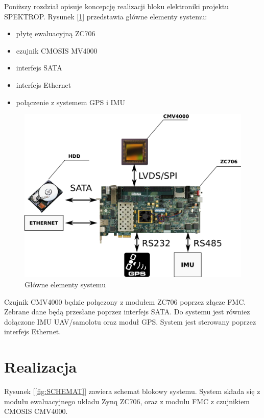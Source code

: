 \documentclass[a4paper,11pt,oneside]{book}  %
\begin{document}
Poniższy rozdział opisuje koncepcję realizacji bloku elektroniki projektu SPEKTROP. Rysunek [\ref{fig:OVER}] przedstawia główne elementy systemu: 
\begin{itemize}
	\item płytę ewaluacyjną ZC706
	\item czujnik CMOSIS MV4000
	\item interfejs SATA
	\item interfejs Ethernet
	\item połączenie z systemem GPS i IMU
\end{itemize}
\begin{figure}[!h]
	\centering
	\includegraphics[width=12cm]{OVER2.png}
	\caption{Główne elementy systemu}
	\label{fig:OVER}
\end{figure}



Czujnik CMV4000 będzie połączony z modułem ZC706 poprzez złącze FMC. Zebrane dane będą przesłane poprzez interfejs SATA. Do systemu jest równiez dołączone IMU UAV/samolotu oraz moduł GPS. System jest sterowany poprzez interfejs Ethernet. 


\chapter{Realizacja}
Rysunek [\ref{fig:SCHEMAT}] zawiera schemat blokowy systemu. System składa się z modułu ewaluacyjnego układu Zynq ZC706, oraz z modułu FMC z czujnikiem CMOSIS CMV4000.
\end{document}
